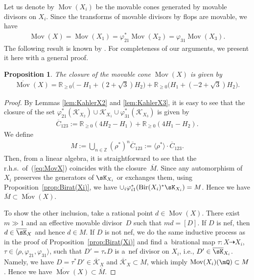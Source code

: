 \documentclass[10pt,a4paper]{amsart}
\numberwithin{equation}{section}
\newtheorem{Proposition}[Theorem]{Proposition}
\begin{document}
Let us denote by $\operatorname{Mov}(X_{i})$ be the movable cones generated
by movable divisors on $X_{i}$. Since the transforms of movable divisors
by flops are movable, we have
\begin{gather*}
\operatorname{Mov}(X)=\operatorname{Mov}(X_{1})=\varphi_{21}^{*}\operatorname{Mov}(X_{2})=\varphi_{31}\operatorname{Mov}(X_{3}).
\end{gather*}
 The following result is known by \cite[Lemma~1]{Fry}. For completeness of our arguments, we present it here with a general proof.
\begin{Proposition}
The closure of the movable cone $\operatorname{Mov}(X)$ is given by
\begin{gather}
\overline{\operatorname{Mov}}(X)=\mathbb{R}_{\geq0}\big({-}H_{1}+(2+\sqrt{3})H_{2}\big) +\mathbb{R}_{\geq0}\big(H_{1}+(-2+\sqrt{3})H_{2}\big).\label{eq:MovX}
\end{gather}
\end{Proposition}
\begin{proof}By Lemmas \ref{lem:KahlerX2} and \ref{lem:KahlerX3}, it is easy to see that the closure of the set $\varphi_{21}^{*}(\mathcal{K}_{X_{2}})\cup\mathcal{K}_{X_{1}}\cup\varphi_{31}^{*}(\mathcal{K}_{X_{3}})$ is given by
\begin{gather*}
\overline{C}_{123}:=\mathbb{R}_{\geq0}(4H_{2}-H_{1})+\mathbb{R}_{\geq0}(4H_{1}-H_{2}).
\end{gather*}
We define
\begin{gather*}
M:=\bigcup_{n\in\mathbb{Z}}(\rho^{*})^{n}\overline{C}_{123}:=\langle\rho^{*}\rangle\cdot\overline{C}_{123}.
\end{gather*}
Then, from a linear algebra, it is straightforward to see that the r.h.s.\ of~(\ref{eq:MovX}) coincides with the closure~$\overline{M}$. Since any automorphism of $X_{i}$ preserves the generators of $\sK_{X_{i}}$ or exchanges them, using Proposition~\ref{prop:Birat(Xi)}, we have $\cup_{i}\varphi_{i1}^{*}(\operatorname{Bir}(X_{i})^{*}\sK_{X_{i}})=M$. Hence we have $\overline{M}\subset\overline{\operatorname{Mov}}(X)$.

To show the other inclusion, take a rational point $d\in\operatorname{Mov}(X)$. There exist $m\gg1$ and an effective movable divisor~$D$ such that
$md=[D]$. If $D$ is nef, then $d\in\overline{\sK}_{X}$ and hence $d\in M$. If $D$ is not nef, we do the same inductive process as in the proof of Proposition~\ref{prop:Birat(Xi)} and find a~birational map $\tau\colon X\dashrightarrow X_{i}$, $\tau\in\langle\rho,\varphi_{21}, \varphi_{31}\rangle$, such that $D'=\tau_{*}D$ is a~nef divisor on $X_{i}$, i.e., $D'\in\overline{\sK}_{X_{i}}$. Namely, we have $D=\tau^{*}D'\in\overline{\mathcal{K}}_{X}$ and $\overline{\mathcal{K}}_{X}\subset M$, which imply $\operatorname{Mov}(X_{i})(\mQ)\subset M$. Hence we have $\overline{\operatorname{Mov}}(X)\subset\overline{M}$.
\end{proof}
\end{document}
